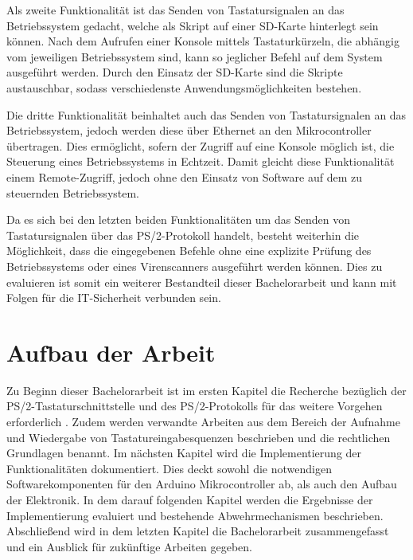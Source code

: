 Als zweite Funktionalität ist das Senden von Tastatursignalen an das Betriebssystem gedacht, welche als Skript auf einer SD-Karte hinterlegt sein können. Nach dem Aufrufen einer Konsole mittels Tastaturkürzeln, die abhängig vom jeweiligen Betriebssystem sind, kann so jeglicher Befehl auf dem System ausgeführt werden. Durch den Einsatz der SD-Karte sind die Skripte austauschbar, sodass verschiedenste Anwendungsmöglichkeiten bestehen.

Die dritte Funktionalität beinhaltet auch das Senden von Tastatursignalen an das Betriebssystem, jedoch werden diese über Ethernet an den Mikrocontroller übertragen. Dies ermöglicht, sofern der Zugriff auf eine Konsole möglich ist, die Steuerung eines Betriebssystems in Echtzeit. Damit gleicht diese Funktionalität einem Remote-Zugriff, jedoch ohne den Einsatz von Software auf dem zu steuernden Betriebssystem.

Da es sich bei den letzten beiden Funktionalitäten um das Senden von Tastatursignalen über das PS/2-Protokoll handelt, besteht weiterhin die Möglichkeit, dass die eingegebenen Befehle ohne eine explizite Prüfung des Betriebssystems oder eines Virenscanners ausgeführt werden können. Dies zu evaluieren ist somit ein weiterer Bestandteil dieser Bachelorarbeit und kann mit Folgen für die IT-Sicherheit verbunden sein.



\section{Aufbau der Arbeit}
Zu Beginn dieser Bachelorarbeit ist im ersten Kapitel die Recherche bezüglich der PS/2-Tastaturschnittstelle und des PS/2-Protokolls für das weitere Vorgehen erforderlich . Zudem werden verwandte Arbeiten aus dem Bereich der Aufnahme und Wiedergabe von Tastatureingabesquenzen beschrieben und die rechtlichen Grundlagen benannt. Im nächsten Kapitel wird die Implementierung der Funktionalitäten dokumentiert. Dies deckt sowohl die notwendigen Softwarekomponenten für den Arduino Mikrocontroller ab, als auch den Aufbau der Elektronik. In dem darauf folgenden Kapitel werden die Ergebnisse der Implementierung evaluiert und bestehende Abwehrmechanismen beschrieben. Abschließend wird in dem letzten Kapitel die Bachelorarbeit zusammengefasst und ein Ausblick für zukünftige Arbeiten gegeben.